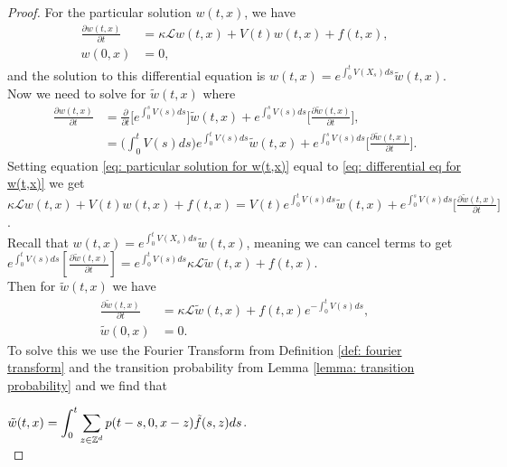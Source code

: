 \documentclass[sn-basic]{sn-jnl}%
\theoremstyle{thmstyleone}%
\theoremstyle{thmstyletwo}%
\theoremstyle{thmstylethree}%
\numberwithin{equation}{theorem}
\begin{document}
\begin{proof}
For the particular solution $w(t,x)$, we have
\begin{align}
\label{eq: particular solution for w(t,x)}
\displaystyle \frac{\partial w(t,x)}{\partial t} &= \kappa \mathcal{L} w(t,x) + V(t)w(t,x) + f(t,x),\\
w(0,x) &= 0,
\end{align}
and the solution to this differential equation is $w(t,x) = e^{\displaystyle \int_{0}^{t} V(X_{s})ds} \tilde{w}(t,x)$. Now we need to solve for $\tilde{w}(t,x)$ where
\begin{align}
\displaystyle \frac{\partial w(t,x)}{\partial t} &= \displaystyle \frac{\partial}{\partial t} \Bigg[e^{\displaystyle \int_{0}^{s} V(s)ds} \Bigg] \tilde{w} (t,x) + e^{\displaystyle \int_{0}^{s} V(s)ds} \Bigg[ \displaystyle \frac{\partial \tilde{w} (t,x)}{ \partial t} \Bigg],\\
\label{eq: differential eq for w(t,x)}
&= \Big(\displaystyle \int_{0}^{t}V(s)ds \Big) e^{\displaystyle \int_{0}^{t}V(s)ds} \tilde{w} (t,x) + e^{\displaystyle \int_{0}^{s} V(s)ds} \Bigg[ \displaystyle \frac{\partial \tilde{w} (t,x)}{ \partial t} \Bigg].
\end{align}
Setting equation \eqref{eq: particular solution for w(t,x)} equal to \eqref{eq: differential eq for w(t,x)} we get\\
$\kappa \mathcal{L} w(t,x) + V(t)w(t,x) + f(t,x) = V(t) e^{ \int_{0}^{t}V(s)ds} \tilde{w} (t,x) + e^{ \int_{0}^{s} V(s)ds} \Bigg[ \displaystyle \frac{\partial \tilde{w} (t,x)}{ \partial t} \Bigg]$.\\
Recall that $w(t,x) = e^{\displaystyle \int_{0}^{t} V(X_{s})ds} \tilde{w}(t,x)$, meaning we can cancel terms to get\\
$e^{\displaystyle \int_{0}^{t} V(s)ds} \left[ \displaystyle \frac{\partial \tilde{w} (t,x)}{\partial t} \right] = e^{\displaystyle \int_{0}^{t} V(s)ds} \kappa \mathcal{L} \tilde{w} (t,x) + f(t,x)$.\\
Then for $\tilde{w} (t,x)$ we have
\begin{align}
\displaystyle \frac{\partial \tilde{w}(t,x)}{\partial t} &= \kappa \mathcal{L} \tilde{w}(t,x) + f(t,x) e^{\displaystyle - \int_{0}^{t} V(s)ds},\\
\tilde{w}(0,x) &= 0.
\end{align}
To solve this we use the Fourier Transform from Definition \ref{def: fourier transform} and the transition probability from Lemma \ref{lemma: transition probability} and we find that

$\tilde{w}(t,x) = \displaystyle \int_{0}^{t} \sum\limits_{z \in \mathbb{Z}^{d}} \mathnormal{p} (t-s, 0, x-z) \tilde{f}(s,z)ds$.\\


\end{proof}
\end{document}

